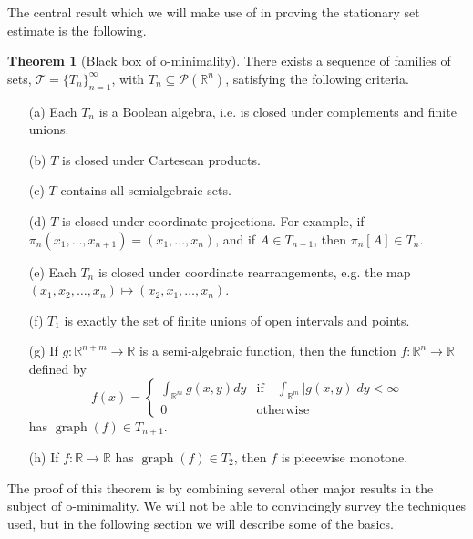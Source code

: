\documentclass[12pt]{article}
\newcommand{\R}{\mathbb{R}}
\theoremstyle{definition}
\newtheorem{theorem}{Theorem}[section]
\theoremstyle{remark}
\numberwithin{equation}{section}
\begin{document}
The central result which we will make use of in proving the stationary set estimate is the following.

\begin{theorem}[Black box of o-minimality]\label{blackbox} There exists a sequence of families of sets, $\mathcal{T}=\{T_n\}_{n=1}^\infty$, with $T_n\subseteq\mathcal{P}(\R^n)$, satisfying the following criteria.
\begin{itemize}
    \item[(a)] Each $T_n$ is a Boolean algebra, i.e. is closed under complements and finite unions.
    \item[(b)] $T$ is closed under Cartesean products.
    \item[(c)] $T$ contains all semialgebraic sets.
    \item[(d)] $T$ is closed under coordinate projections. For example, if $\pi_n(x_1,\ldots,x_{n+1})=(x_1,\ldots,x_n)$, and if $A\in T_{n+1}$, then $\pi_n[A]\in T_n$.
    \item[(e)] Each $T_n$ is closed under coordinate rearrangements, e.g. the map $(x_1,x_2,\ldots,x_n)\mapsto(x_2,x_1,\ldots,x_n)$.
    \item[(f)] $T_1$ is exactly the set of finite unions of open intervals and points.
    \item[(g)] If $g:\R^{n+m}\to\R$ is a semi-algebraic function, then the function $f:\R^n\to\R$ defined by
    \begin{equation*}
        f(x)=\begin{cases}
            \int_{\R^m}g(x,y)dy & \text{if}\quad\int_{\R^m}|g(x,y)|dy<\infty\\
            0 &\text{otherwise}
        \end{cases}
    \end{equation*}
    has $\operatorname{graph}(f)\in T_{n+1}$.
    \item[(h)] If $f:\R\to\R$ has $\operatorname{graph}(f)\in T_2$, then $f$ is piecewise monotone.
\end{itemize}

\end{theorem}

The proof of this theorem is by combining several other major results in the subject of o-minimality. We will not be able to convincingly survey the techniques used, but in the following section we will describe some of the basics.
\end{document}
